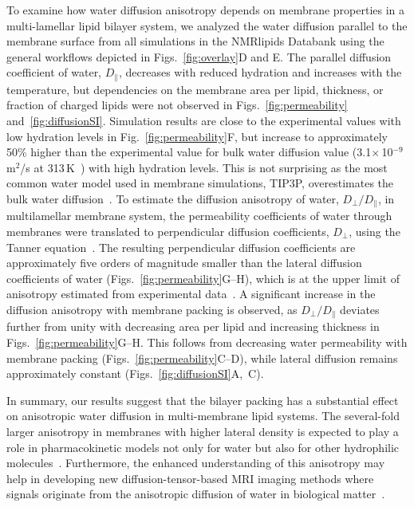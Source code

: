 \documentclass[fleqn,10pt]{wlscirep}
\begin{document}
To examine how water diffusion anisotropy depends on membrane properties in a multi-lamellar lipid bilayer system, we analyzed the water diffusion parallel to the membrane surface from all simulations in the NMRlipids Databank using the general workflows depicted in Figs.~\ref{fig:overlay}D and E. The parallel diffusion coefficient of water, $D_\parallel$, decreases with reduced hydration and increases with the temperature, but dependencies on the membrane area per lipid, thickness, or fraction of charged lipids were not observed in Figs.~\ref{fig:permeability} and~\ref{fig:diffusionSI}. Simulation results are close to the experimental values with low hydration levels in Fig.~\ref{fig:permeability}F, but increase to approximately 50\% higher than the experimental value for bulk water diffusion value (3.1$\times$\,10$^{-9}$\,m$^2$/s at 313\,K~\cite{khakimov08}) with high hydration levels.
This is not surprising as the most common water model used in membrane simulations, TIP3P, overestimates the bulk water diffusion~\cite{pathirannahalage21}. To estimate the diffusion anisotropy of water, $D_\perp/D_\parallel$, in multilamellar membrane system, the permeability coefficients of water through membranes were translated to perpendicular diffusion coefficients, $D_\perp$, using the Tanner equation~\cite{tanner78,wasterby02}. The resulting perpendicular diffusion coefficients are approximately five orders of magnitude smaller than the lateral diffusion coefficients of water (Figs.~\ref{fig:permeability}G--H), which is at the upper limit of anisotropy estimated from experimental data~\cite{nitsche19}. A significant increase in the diffusion anisotropy with membrane packing is observed, as $D_\perp/D_\parallel$ deviates further from unity with decreasing area per lipid and increasing thickness in Figs.~\ref{fig:permeability}G--H. This follows from decreasing water permeability with membrane packing (Figs.~\ref{fig:permeability}C--D), while lateral diffusion remains approximately constant (Figs.~\ref{fig:diffusionSI}A,~C).

In summary, our results suggest that the bilayer packing has a substantial effect on anisotropic water diffusion in multi-membrane lipid systems. The several-fold larger anisotropy in membranes with higher lateral density is expected to play a role in pharmacokinetic models not only for water but also for other hydrophilic molecules~\cite{nitsche19}. Furthermore, the enhanced understanding of this anisotropy may help in developing new diffusion-tensor-based MRI imaging methods where signals originate from the anisotropic diffusion of water in biological matter~\cite{topgaard20}.
\end{document}
